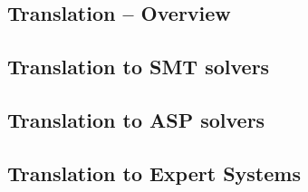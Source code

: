 \subsection{Translation -- Overview}\label{sec:translation_overview}

\subsection{Translation to SMT solvers}\label{sec:translation_smt}

\subsection{Translation to ASP solvers}\label{sec:translation_asp}

\subsection{Translation to Expert Systems}\label{sec:translation_expertsystem}




